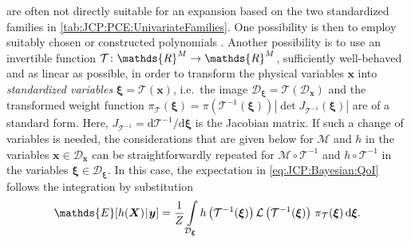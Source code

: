 are often not directly suitable for an expansion based on the two standardized families in \cref{tab:JCP:PCE:UnivariateFamilies}.
One possibility is then to employ suitably chosen or constructed polynomials \cite{PCE:Xiu2002:b,PCE:Witteveen2007}.
Another possibility is to use an invertible function \(\mathcal{T} \colon \mathds{R}^\dimParam \rightarrow \mathds{R}^\dimParam\), sufficiently well-behaved and as linear as possible,
in order to transform the physical variables \(\bm{x}\) into \emph{standardized variables} \(\bm{\xi} = \mathcal{T}(\bm{x})\),
i.e.\ the image \(\mathcal{D}_{\bm{\xi}} = \mathcal{T}(\mathcal{D}_{\bm{x}})\) and the transformed weight function
\(\pi_{\mathcal{T}}(\bm{\xi}) = \pi(\mathcal{T}^{-1}(\bm{\xi})) \left\lvert \det J_{\mathcal{T}^{-1}}(\bm{\xi}) \right\rvert\) are of a standard form.
Here, \(J_{\mathcal{T}^{-1}} = \mathrm{d} \mathcal{T}^{-1} / \mathrm{d} \bm{\xi}\) is the Jacobian matrix.
If such a change of variables is needed, the considerations that are given below for \(\mathcal{M}\) and \(h\) in the variables \(\bm{x} \in \mathcal{D}_{\bm{x}}\)
can be straightforwardly repeated for \(\mathcal{M} \circ \mathcal{T}^{-1}\) and \(h \circ \mathcal{T}^{-1}\) in the variables \(\bm{\xi} \in \mathcal{D}_{\bm{\xi}}\).
In this case, the expectation in \cref{eq:JCP:Bayesian:QoI} follows the integration by substitution
\begin{equation} \label{eq:JCP:PCE:IntegrationBySubstitution}
  \mathds{E}[h(\bm{X}) \cond \bm{y}]
  = \frac{1}{\scale} \int\limits_{\mathcal{D}_{\bm{\xi}}} h \left( \mathcal{T}^{-1}(\bm{\xi}) \right)
  \mathcal{L} \left( \mathcal{T}^{-1}(\bm{\xi}) \right) \, \pi_{\mathcal{T}}(\bm{\xi}) \, \mathrm{d} \bm{\xi}.
\end{equation}

